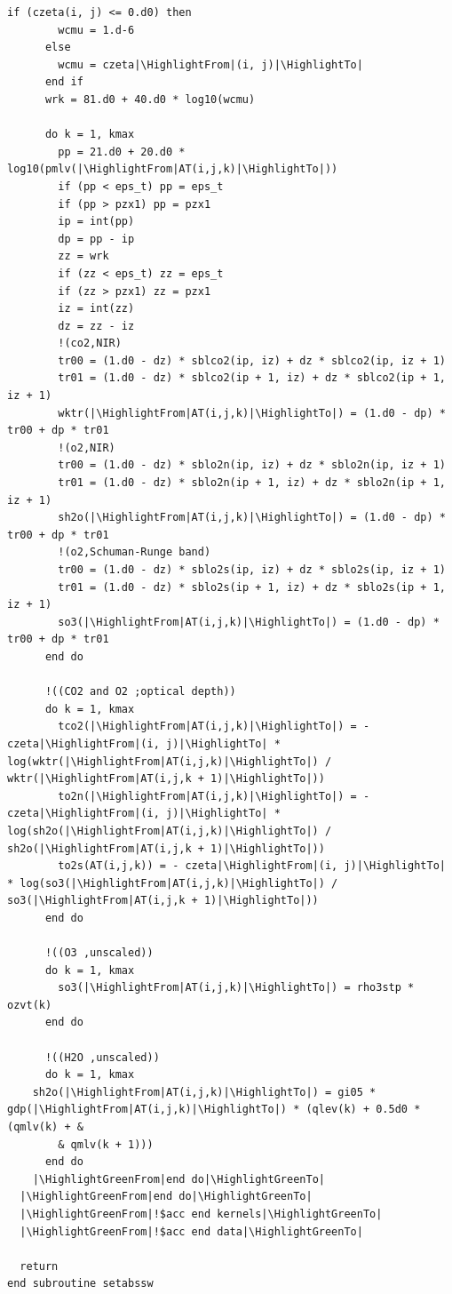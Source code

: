 \begin{lstlisting}[firstnumber=1, name=absswOpenACC, label=listing:absswOpenACC, caption={Example ASUCA kernel subroutine in OpenACC}, escapechar=|]
      if (czeta(i, j) <= 0.d0) then
        wcmu = 1.d-6
      else
        wcmu = czeta|\HighlightFrom|(i, j)|\HighlightTo|
      end if
      wrk = 81.d0 + 40.d0 * log10(wcmu)

      do k = 1, kmax
        pp = 21.d0 + 20.d0 * log10(pmlv(|\HighlightFrom|AT(i,j,k)|\HighlightTo|))
        if (pp < eps_t) pp = eps_t
        if (pp > pzx1) pp = pzx1
        ip = int(pp)
        dp = pp - ip
        zz = wrk
        if (zz < eps_t) zz = eps_t
        if (zz > pzx1) zz = pzx1
        iz = int(zz)
        dz = zz - iz
        !(co2,NIR)
        tr00 = (1.d0 - dz) * sblco2(ip, iz) + dz * sblco2(ip, iz + 1)
        tr01 = (1.d0 - dz) * sblco2(ip + 1, iz) + dz * sblco2(ip + 1, iz + 1)
        wktr(|\HighlightFrom|AT(i,j,k)|\HighlightTo|) = (1.d0 - dp) * tr00 + dp * tr01
        !(o2,NIR)
        tr00 = (1.d0 - dz) * sblo2n(ip, iz) + dz * sblo2n(ip, iz + 1)
        tr01 = (1.d0 - dz) * sblo2n(ip + 1, iz) + dz * sblo2n(ip + 1, iz + 1)
        sh2o(|\HighlightFrom|AT(i,j,k)|\HighlightTo|) = (1.d0 - dp) * tr00 + dp * tr01
        !(o2,Schuman-Runge band)
        tr00 = (1.d0 - dz) * sblo2s(ip, iz) + dz * sblo2s(ip, iz + 1)
        tr01 = (1.d0 - dz) * sblo2s(ip + 1, iz) + dz * sblo2s(ip + 1, iz + 1)
        so3(|\HighlightFrom|AT(i,j,k)|\HighlightTo|) = (1.d0 - dp) * tr00 + dp * tr01
      end do

      !((CO2 and O2 ;optical depth))
      do k = 1, kmax
        tco2(|\HighlightFrom|AT(i,j,k)|\HighlightTo|) = - czeta|\HighlightFrom|(i, j)|\HighlightTo| * log(wktr(|\HighlightFrom|AT(i,j,k)|\HighlightTo|) / wktr(|\HighlightFrom|AT(i,j,k + 1)|\HighlightTo|))
        to2n(|\HighlightFrom|AT(i,j,k)|\HighlightTo|) = - czeta|\HighlightFrom|(i, j)|\HighlightTo| * log(sh2o(|\HighlightFrom|AT(i,j,k)|\HighlightTo|) / sh2o(|\HighlightFrom|AT(i,j,k + 1)|\HighlightTo|))
        to2s(AT(i,j,k)) = - czeta|\HighlightFrom|(i, j)|\HighlightTo| * log(so3(|\HighlightFrom|AT(i,j,k)|\HighlightTo|) / so3(|\HighlightFrom|AT(i,j,k + 1)|\HighlightTo|))
      end do

      !((O3 ,unscaled))
      do k = 1, kmax
        so3(|\HighlightFrom|AT(i,j,k)|\HighlightTo|) = rho3stp * ozvt(k)
      end do

      !((H2O ,unscaled))
      do k = 1, kmax
	sh2o(|\HighlightFrom|AT(i,j,k)|\HighlightTo|) = gi05 * gdp(|\HighlightFrom|AT(i,j,k)|\HighlightTo|) * (qlev(k) + 0.5d0 * (qmlv(k) + &
        & qmlv(k + 1)))
      end do
    |\HighlightGreenFrom|end do|\HighlightGreenTo|
  |\HighlightGreenFrom|end do|\HighlightGreenTo|
  |\HighlightGreenFrom|!$acc end kernels|\HighlightGreenTo|
  |\HighlightGreenFrom|!$acc end data|\HighlightGreenTo|

  return
end subroutine setabssw
\end{lstlisting}

